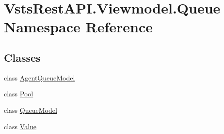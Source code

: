 \hypertarget{namespace_vsts_rest_a_p_i_1_1_viewmodel_1_1_queue}{}\section{Vsts\+Rest\+A\+P\+I.\+Viewmodel.\+Queue Namespace Reference}
\label{namespace_vsts_rest_a_p_i_1_1_viewmodel_1_1_queue}
\subsection*{Classes}
\begin{DoxyCompactItemize}
\item 
class \mbox{\hyperlink{class_vsts_rest_a_p_i_1_1_viewmodel_1_1_queue_1_1_agent_queue_model}{Agent\+Queue\+Model}}
\item 
class \mbox{\hyperlink{class_vsts_rest_a_p_i_1_1_viewmodel_1_1_queue_1_1_pool}{Pool}}
\item 
class \mbox{\hyperlink{class_vsts_rest_a_p_i_1_1_viewmodel_1_1_queue_1_1_queue_model}{Queue\+Model}}
\item 
class \mbox{\hyperlink{class_vsts_rest_a_p_i_1_1_viewmodel_1_1_queue_1_1_value}{Value}}
\end{DoxyCompactItemize}
